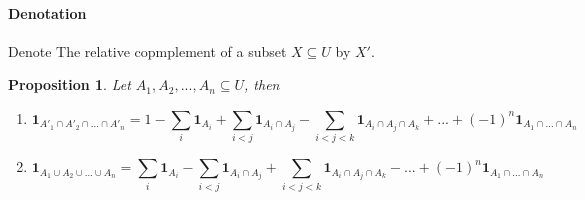 \documentclass[12pt]{article}
\newtheorem{proposition}{Proposition}[subsection]
\begin{document}
    \paragraph{Denotation}
        Denote The relative copmplement of a subset $X \subseteq U$ by $X'$.
    \begin{proposition}
        Let $A_1, A_2, ..., A_n \subseteq U$, then
        \begin{enumerate}
            \item
            \begin{equation} 
                \textbf{1}_{A'_1 \cap A'_2 \cap ...\cap A'_n} = 1-\sum_i \textbf{1}_{A_i} + \sum_{i<j}\textbf{1}_{A_i \cap A_j} - \sum_{i < j < k}\textbf{1}_{A_i \cap A_j \cap A_k} + ... + (-1)^n\textbf{1}_{A_1\cap ...\cap A_n}
            \end{equation}
            \item
            \begin{equation}
                \textbf{1}_{A_1 \cup A_2 \cup ...\cup A_n} = \sum_i \textbf{1}_{A_i} - \sum_{i<j}\textbf{1}_{A_i \cap A_j} + \sum_{i < j < k}\textbf{1}_{A_i \cap A_j \cap A_k} - ... + (-1)^n\textbf{1}_{A_1\cap ...\cap A_n}
            \end{equation}

        \end{enumerate}

    \end{proposition}
\end{document}
